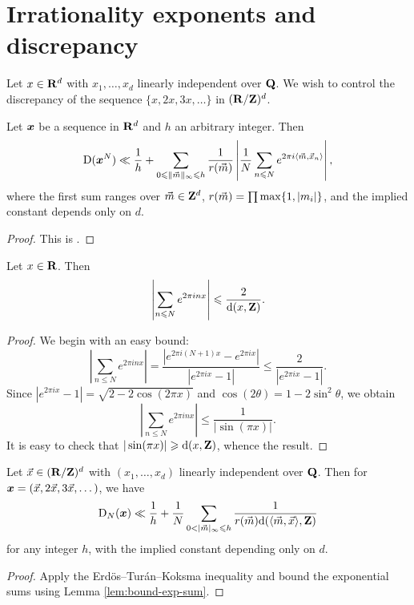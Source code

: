 \section{Irrationality exponents and discrepancy}

Let $x\in \mathbf{R}^d$ with $x_1,\dots,x_d$ linearly independent over $\mathbf{Q}$. We wish 
to control the discrepancy of the sequence $\{x,2x,3x,\dots\}$ in 
$(\mathbf{R}/\mathbf{Z})^d$. 

\begin{theorem}
Let ${\boldsymbol x}$ be a sequence in $\mathbf{R}^d$ and $h$ an arbitrary integer. Then 
\[
	\operatorname{D}({\boldsymbol x}^N) \ll \frac 1 h + \sum_{0\leqslant \|\vec{m}\|_\infty \leqslant h} \frac{1}{r(\vec{m})} \left| \frac 1 N \sum_{n\leqslant N} e^{2\pi i \langle \vec{m},\vec{x}_n\rangle}\right| ,
\]
where the first sum ranges over $\vec{m}\in \mathbf{Z}^d$, 
$r(\vec{m}) = \prod \max\{1,|m_i|\}$, and the implied constant depends only on $d$. 
\end{theorem}
\begin{proof}
This is \cite[Th.~1.21]{drmota-tichy-1997}. 
\end{proof}

\begin{lemma}\label{lem:bound-exp-sum}
Let $x\in \mathbf{R}$. Then 
\[
	\left| \sum_{n\leqslant N} e^{2\pi i n x}\right| \leqslant \frac{2}{\mathrm{d}(x, \mathbf{Z})} .
\]
\end{lemma}
\begin{proof}
We begin with an easy bound: 
\[
	\left| \sum_{n\leqslant N} e^{2\pi i n x}\right| = \frac{|e^{2\pi i (N+1) x} - e^{2\pi i x}|}{|e^{2\pi i x} - 1|} \leqslant \frac{2}{|e^{2\pi i x} - 1|} .
\]
Since $|e^{2\pi i x} - 1| = \sqrt{2-2\cos(2\pi x)}$ and 
$\cos(2\theta) = 1-2\sin^2\theta$, we obtain 
\[
	\left|\sum_{n\leqslant N} e^{2\pi i n x}\right| \leqslant \frac{1}{|\sin(\pi x)|} .
\]
It is easy to check that $|\sin(\pi x)| \geqslant \mathrm{d}(x,\mathbf{Z})$, whence the result.  
\end{proof}

\begin{corollary}\label{cor:bound-disc-distance}
Let $\vec{x}\in (\mathbf{R}/\mathbf{Z})^d$ with $(x_1,\dots,x_d)$ linearly independent over $\mathbf{Q}$. 
Then for ${\boldsymbol x}=(\vec{x},2\vec{x},3\vec{x},\dots)$, we have 
\[
	\D_N(\bx) \ll \frac 1 h + \frac 1 N \sum_{0<|\vm|_\infty \leqslant h} \frac{1}{r(\vm) \dd(\langle \vm,\vx\rangle,\bZ)} 
\]
for any integer $h$, with the implied constant depending only on $d$. 
\end{corollary}
\begin{proof}
Apply the Erd\"os--Tur\'an--Koksma inequality and bound the exponential sums 
using Lemma \ref{lem:bound-exp-sum}. 
\end{proof}

